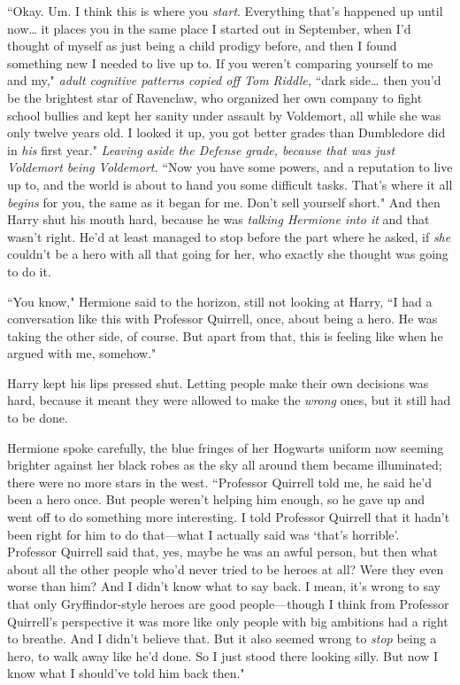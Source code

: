 ``Okay. Um. I think this is where you \emph{start}. Everything that's happened up until now{\ldots} it places you in the same place I started out in September, when I'd thought of myself as just being a child prodigy before, and then I found something new I needed to live up to. If you weren't comparing yourself to me and my," \emph{adult cognitive patterns copied off Tom Riddle,} ``dark side{\ldots} then you'd be the brightest star of Ravenclaw, who organized her own company to fight school bullies and kept her sanity under assault by Voldemort, all while she was only twelve years old. I looked it up, you got better grades than Dumbledore did in \emph{his} first year." \emph{Leaving aside the Defense grade, because that was just Voldemort being Voldemort.} ``Now you have some powers, and a reputation to live up to, and the world is about to hand you some difficult tasks. That's where it all \emph{begins} for you, the same as it began for me. Don't sell yourself short." And then Harry shut his mouth hard, because he was \emph{talking Hermione into it} and that wasn't right. He'd at least managed to stop before the part where he asked, if \emph{she} couldn't be a hero with all that going for her, who exactly she thought was going to do it.

``You know," Hermione said to the horizon, still not looking at Harry, ``I had a conversation like this with Professor Quirrell, once, about being a hero. He was taking the other side, of course. But apart from that, this is feeling like when he argued with me, somehow."

Harry kept his lips pressed shut. Letting people make their own decisions was hard, because it meant they were allowed to make the \emph{wrong} ones, but it still had to be done.

Hermione spoke carefully, the blue fringes of her Hogwarts uniform now seeming brighter against her black robes as the sky all around them became illuminated; there were no more stars in the west. ``Professor Quirrell told me, he said he'd been a hero once. But people weren't helping him enough, so he gave up and went off to do something more interesting. I told Professor Quirrell that it hadn't been right for him to do that—what I actually said was `that's horrible'. Professor Quirrell said that, yes, maybe he was an awful person, but then what about all the other people who'd never tried to be heroes at all? Were they even worse than him? And I didn't know what to say back. I mean, it's wrong to say that only Gryffindor-style heroes are good people—though I think from Professor Quirrell's perspective it was more like only people with big ambitions had a right to breathe. And I didn't believe that. But it also seemed wrong to \emph{stop} being a hero, to walk away like he'd done. So I just stood there looking silly. But now I know what I should've told him back then."

